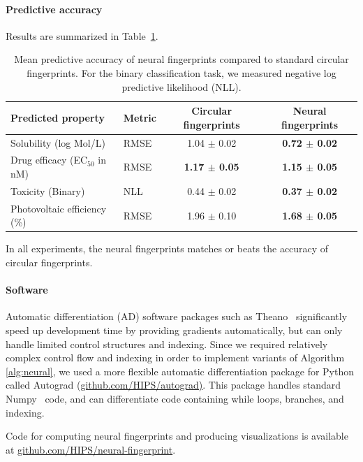 \documentclass{article}
\newcommand{\citep}{\cite}
\newcommand{\citet}{\cite}
\begin{document}
\paragraph{Predictive accuracy}
Results are summarized in Table~\ref{table:main results}.
%
\begin{table}
\begin{center}
\begin{tabular}{ll|cc}
Predicted property                                  & Metric & Circular fingerprints        & Neural fingerprints   \\
\midrule
Solubility (log Mol/L)           \citet{delaney_data_2004}   &   RMSE & 1.04 $\pm$ 0.02 & \bf{0.72} $\pm$ 0.02 \\
Drug efficacy (EC$_{50}$ in nM)  \citet{gamo2010thousands}   &   RMSE & \bf{1.17} $\pm$ 0.05 & \bf{1.15} $\pm$ 0.05 \\
Toxicity (Binary)                \citet{tox21}               &   NLL  & 0.44 $\pm$ 0.02  & \bf{0.37} $\pm$ 0.02 \\
Photovoltaic efficiency (\%)     \citet{hachmann2011harvard} &  RMSE  & 1.96 $\pm$ 0.10  & \bf{1.68} $\pm$ 0.05
\end{tabular}
\label{table:main results}
\caption{Mean predictive accuracy of neural fingerprints compared to standard circular fingerprints.
For the binary classification task, we measured negative log predictive likelihood (NLL).}
\end{center}
\end{table}
%
In all experiments, the neural fingerprints matches or beats the accuracy of circular fingerprints.

\paragraph{Software}
Automatic differentiation (AD) software packages such as Theano~\citep{Bastien-Theano-2012} significantly speed up development time by providing gradients automatically, but can only handle limited control structures and indexing.
Since we required relatively complex control flow and indexing in order to implement variants of Algorithm \ref{alg:neural}, we used a more flexible automatic differentiation package for Python called Autograd (\url{github.com/HIPS/autograd)}.
This package handles standard Numpy~\citep{oliphant2007python} code, and can differentiate code containing while loops, branches, and indexing.

Code for computing neural fingerprints and producing visualizations is available at \url{github.com/HIPS/neural-fingerprint}.
\end{document}
